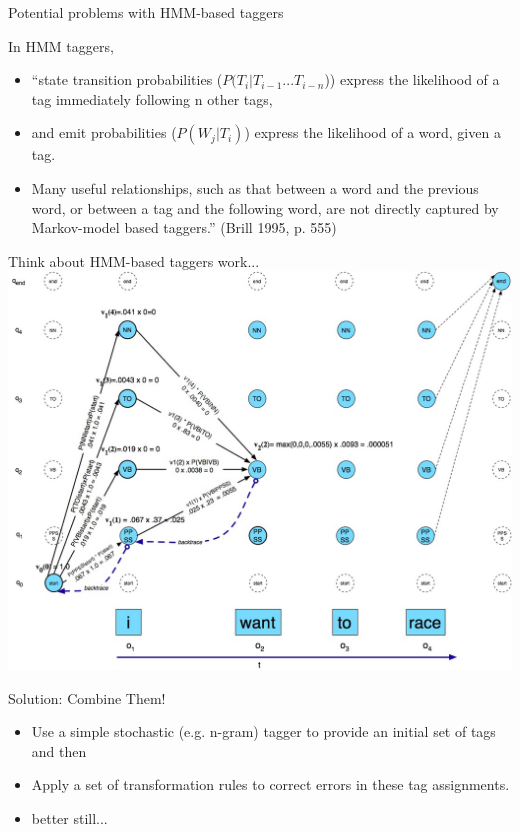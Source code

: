 \documentclass[9pt,xcolor=pdftex,dvipsnames,table]{beamer}
\begin{document}
\begin{frame}{Potential problems with HMM-based taggers}

{\large In HMM taggers,}

\vspace{.5cm}

\begin{itemize}
	\item ``state transition probabilities ($P(T_i | T_{i-1}... T_{i-n}$)) express the likelihood of a tag immediately following n other tags,
	\item and emit probabilities ($P(W_j | T_i)$) express the likelihood of a word, given a tag.
	\item Many useful relationships, such as that between a word and the previous word, or between a tag and the following word, are not directly captured by Markov-model based taggers.'' (Brill 1995, p. 555)
\end{itemize}
\end{frame}

\begin{frame}{Think about HMM-based taggers work...}
	\includegraphics[width=.75\paperwidth]{pos5-18}
\end{frame}
		
\begin{frame}{Solution: Combine Them!}
	\begin{itemize}
		\item Use a simple stochastic (e.g. n-gram) tagger to provide an initial set of tags and then
		\item Apply a set of transformation rules to correct errors in these tag assignments.
		\item better still...
	\end{itemize}
\end{frame}
\end{document}
